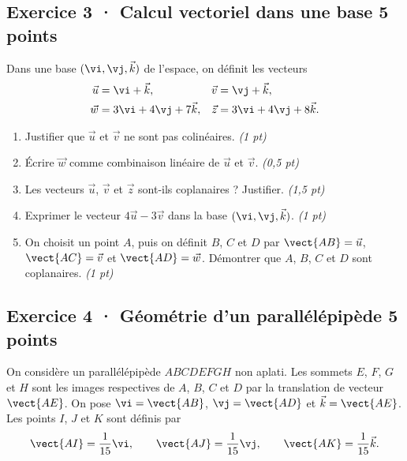 \clearpage{}\par

\subsection*{Exercice 3 · Calcul vectoriel dans une base \hfill 5 points}Dans une base $(\vi,\vj,\vec k)$ de l'espace, on définit les vecteurs
\[\begin{aligned}\vec u&=\vi+\vec k,&\vec v&=\vj+\vec k,\\
\vec w&=3\vi+4\vj+7\vec k,&\vec z&=3\vi+4\vj+8\vec k.\end{aligned}\]

\begin{enumerate}

\item Justifier que $\vec u$ et $\vec v$ ne sont pas colinéaires. \hfill\textit{(1 pt)}

\item Écrire $\vec w$ comme combinaison linéaire de $\vec u$ et $\vec v$. \hfill\textit{(0,5 pt)}

\item Les vecteurs $\vec u$, $\vec v$ et $\vec z$ sont-ils coplanaires ? Justifier. \hfill\textit{(1,5 pt)}

\item Exprimer le vecteur $4\vec u-3\vec v$ dans la base $(\vi,\vj,\vec k)$. \hfill\textit{(1 pt)}

\item On choisit un point $A$, puis on définit $B$, $C$ et $D$ par $\vect{AB}=\vec u$, $\vect{AC}=\vec v$ et $\vect{AD}=\vec w$. Démontrer que $A$, $B$, $C$ et $D$ sont coplanaires. \hfill\textit{(1 pt)}

\end{enumerate}

\subsection*{Exercice 4 · Géométrie d'un parallélépipède \hfill 5 points}On considère un parallélépipède $ABCDEFGH$ non aplati. Les sommets $E$, $F$, $G$ et $H$ sont les images respectives de $A$, $B$, $C$ et $D$ par la translation de vecteur $\vect{AE}$.
On pose $\vi=\vect{AB}$, $\vj=\vect{AD}$ et $\vec k=\vect{AE}$.
Les points $I$, $J$ et $K$ sont définis par
\[\vect{AI}=\frac1{15}\vi,\qquad\vect{AJ}=\frac1{15}\vj,\qquad\vect{AK}=\frac1{15}\vec k.\]

